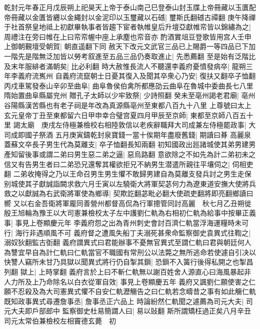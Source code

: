 乾封元年春正月戊辰朔上祀昊天上帝于泰山南己巳登泰山封玉牒上帝冊藏以玉匱配帝冊藏以金匱皆纒以金繩封以金泥印以玉璽藏以石䃭|{
	璽斯氏翻䃭古禫翻}
庚午降禪于社首祭皇地祗上初獻畢執事者皆趨下宦者執帷皇后升壇亞獻帷帟皆以錦繡為之|{
	周禮注在旁曰帷在上曰帟帟幄中座上承塵也帟音亦}
酌酒實俎豆登歌皆用宫人壬申上御朝覲壇受朝賀|{
	朝直遥翻下同}
赦天下改元文武官三品已上賜爵一等四品已下加一階先是階無泛加皆以勞考叙進至五品三品仍奏取進止|{
	先悉薦翻}
至是始有泛階比及末年服緋者滿朝矣|{
	比必利翻}
時大赦惟長流人不聽還李義府憂憤發病卒|{
	龍朔三年李義府流嶲州}
自義府流竄朝士日憂其復入及聞其卒衆心乃安|{
	復扶又翻卒子恤翻}
丙戍車駕發泰山辛卯至曲阜|{
	曲阜魯侯伯禽所都應劭云曲阜在魯城中委曲長七八里隋始置曲阜縣屬兖州}
贈孔子太師以少牢致祭|{
	少詩照翻}
癸未至亳州謁老君廟|{
	亳州谷陽縣漢苦縣也有老子祠是年改為真源縣亳州至東都八百九十八里}
上尊號曰太上玄元皇帝丁丑至東都留六日甲申幸合璧宫夏四月甲辰至京師|{
	東都至京師八百五十里}
謁太廟　庚戌左侍極兼檢校右相陸敦信以老疾辭職拜大司成兼左侍極罷政事|{
	大司成即國子祭酒}
五月庚寅鑄乾封泉寶錢一當十俟期年盡廢舊錢|{
	期讀曰朞}
高麗泉蓋蘇文卒長子男生代為莫離支|{
	卒子恤翻長知兩翻}
初知國政出廵諸城使其弟男建男產知留後事或謂二弟曰男生惡二弟之逼|{
	惡烏路翻}
意欲除之不如先為計二弟初未之信又有告男生者曰二弟恐兄還奪其權欲拒兄不納男生潜遣所親往平壤伺之|{
	伺相吏翻}
二弟收掩得之乃以王命召男生男生懼不敢歸男建自為莫離支發兵討之男生走保别城使其子獻誠詣闕求救六月壬寅以左驍衛大將軍契苾何力為遼東道安撫大使將兵救之以獻誠為右武衛將軍使為鄉導|{
	契欺訖翻苾毗必翻大使疏吏翻將即亮翻鄉讀曰嚮}
又以右金吾衛將軍龎同善營州都督高侃為行軍摠管同討高麗　秋七月乙丑朔徙殷王旭輪為豫王以大司憲兼檢校太子左中護劉仁軌為右相初仁軌為給事中按畢正義事|{
	事見上卷顯慶元年}
李義府怨之出為青州刺史會討百濟仁軌當浮海運糧時未可行|{
	海行非遇順風不可}
義府督之遭風失船丁夫溺死甚衆命監察御史袁異式往鞫之|{
	溺奴狄翻監古衘翻}
義府謂異式曰君能辦事不憂無官異式至謂仁軌曰君與朝廷何人為讐宜早自為計仁軌曰仁軌當官不職國有常刑公以法斃之無所逃命若使遽自引决以快讐人竊所未甘乃具獄以聞異式將行仍自掣其鎻|{
	恐鎻不入簧行後得私開之也掣昌列翻}
獄上|{
	上時掌翻}
義府言於上曰不斬仁軌無以謝百姓舍人源直心曰海風暴起非人力所及上乃命除名以白衣從軍自效|{
	事見上卷顯慶五年}
義府又諷劉仁願使害之仁願不忍殺及為大司憲異式懼不自安仁軌瀝觴告之曰仁軌若念疇昔之事有如此觴仁軌既知政事異式尋遷詹事丞|{
	詹事丞正六品上}
時論紛然仁軌聞之遽薦為司元大夫|{
	司元大夫即戶部郎中}
監察御史杜易簡謂人曰|{
	易以䜴翻}
斯所謂矯枉過正矣八月辛丑司元太常伯兼檢校左相竇德玄薨　初

